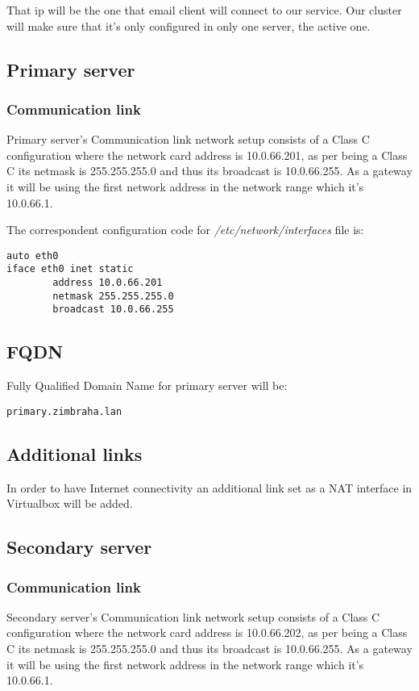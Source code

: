 That ip will be the one that email client will connect to our service. Our cluster will make sure that it's only configured in only one server, the active one.

\subsection {Primary server}

\subsubsection {Communication link}
Primary server's Communication link network setup consists of a Class C configuration where the network card address is 10.0.66.201, as per being a Class C its netmask is 255.255.255.0 and thus its broadcast is 10.0.66.255. As a gateway it will be using the first network address in the network range which it's 10.0.66.1.


The correspondent configuration code for \textit{/etc/network/interfaces} file is:
\begin{verbatim}
auto eth0
iface eth0 inet static
        address 10.0.66.201
        netmask 255.255.255.0
        broadcast 10.0.66.255
\end{verbatim}
\subsection {FQDN}
Fully Qualified Domain Name for primary server will be:
\begin{verbatim}
primary.zimbraha.lan
\end{verbatim}
\subsection {Additional links}
In order to have Internet connectivity an additional link set as a NAT interface in Virtualbox will be added.

\subsection {Secondary server}

\subsubsection {Communication link}
Secondary server's Communication link network setup consists of a Class C configuration where the network card address is 10.0.66.202, as per being a Class C its netmask is 255.255.255.0 and thus its broadcast is 10.0.66.255. As a gateway it will be using the first network address in the network range which it's 10.0.66.1.

